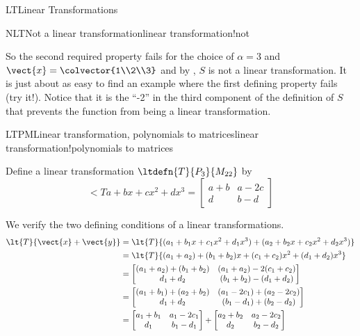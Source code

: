 \begin{subsect}{LT}{Linear Transformations}
\begin{example}{NLT}{Not a linear transformation}{linear transformation!not}
\begin{para}
\end{para}
%
\begin{para}So the second required property fails for the choice of $\alpha=3$ and $\vect{x}=\colvector{1\\2\\3}$ and by , $S$ is not a linear transformation.  It is just about as easy to find an example where the first defining property fails (try it!).  Notice that it is the ``-2'' in the third component of the definition of $S$ that prevents the function from being a linear transformation.\end{para}
%
\end{example}
%
%
\begin{example}{LTPM}{Linear transformation, polynomials to matrices}{linear transformation!polynomials to matrices}
\begin{para}Define a linear transformation $\ltdefn{T}{P_3}{M_{22}}$ by
%
\begin{equation*}
\lt{T}{a+bx+cx^2+dx^3}=\begin{bmatrix}a+b&a-2c\\d&b-d\end{bmatrix}
\end{equation*}
\end{para}
%
\begin{para}We verify the two defining conditions of a linear transformations.
%
\begin{align*}
\lt{T}{\vect{x}+\vect{y}}&=
\lt{T}{(a_1+b_1x+c_1x^2+d_1x^3)+(a_2+b_2x+c_2x^2+d_2x^3)}\\
&=\lt{T}{(a_1+a_2)+(b_1+b_2)x+(c_1+c_2)x^2+(d_1+d_2)x^3}\\
%
&=\begin{bmatrix}
(a_1+a_2)+(b_1+b_2)&(a_1+a_2)-2(c_1+c_2)\\
d_1+d_2&(b_1+b_2)-(d_1+d_2)
\end{bmatrix}\\
%
&=\begin{bmatrix}
(a_1+b_1)+(a_2+b_2)&(a_1-2c_1)+(a_2-2c_2)\\
d_1+d_2&(b_1-d_1)+(b_2-d_2)
\end{bmatrix}\\
%
&=\begin{bmatrix}a_1+b_1&a_1-2c_1\\d_1&b_1-d_1\end{bmatrix}+
     \begin{bmatrix}a_2+b_2&a_2-2c_2\\d_2&b_2-d_2\end{bmatrix}\\

\end{align*}
\end{para}
\end{example}
\end{subsect}
